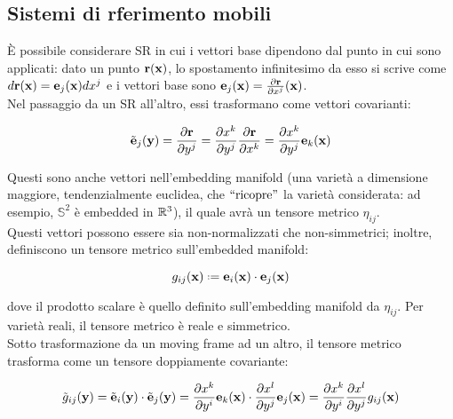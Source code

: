 \subsection{Sistemi di rferimento mobili}

È possibile considerare SR in cui i vettori base dipendono dal punto in cui sono applicati: dato un punto $ \mathbf{r}(\mathbf{x}) $, lo spostamento infinitesimo da esso si scrive come $ d\mathbf{r}(\mathbf{x}) = \mathbf{e}_j(\mathbf{x}) dx^j $ e i vettori base sono $ \mathbf{e}_j (\mathbf{x}) = \frac{\partial \mathbf{r}}{\partial x^j}(\mathbf{x}) $.\\
Nel passaggio da un SR all'altro, essi trasformano come vettori covarianti:

\begin{equation}
	\tilde{\mathbf{e}}_j (\mathbf{y}) = \frac{\partial \mathbf{r}}{\partial y^j} = \frac{\partial x^k}{\partial y^j} \frac{\partial \mathbf{r}}{\partial x^k} = \frac{\partial x^k}{\partial y^j} \mathbf{e}_k (\mathbf{x})
	\label{eq:1.14}
\end{equation}

Questi sono anche vettori nell'embedding manifold (una varietà a dimensione maggiore, tendenzialmente euclidea, che $ ``\text{ricopre}" $ la varietà considerata: ad esempio, $ \mathbb{S}^2 $ è embedded in $ \mathbb{R}^3 $), il quale avrà un tensore metrico $ \eta_{ij} $.\\
Questi vettori possono essere sia non-normalizzati che non-simmetrici; inoltre, definiscono un tensore metrico sull'embedded manifold:

\begin{equation}
	g_{ij} (\ve{x}) \defeq \ve{e}_i (\ve{x}) \cdot \ve{e}_j (\ve{x})
	\label{eq:1.15}
\end{equation}

dove il prodotto scalare è quello definito sull'embedding manifold da $ \eta_{ij} $. Per varietà reali, il tensore metrico è reale e simmetrico.\\
Sotto trasformazione da un moving frame ad un altro, il tensore metrico trasforma come un tensore doppiamente covariante:

\begin{equation}
	\tilde{g}_{ij} (\mathbf{y}) = \tilde{\mathbf{e}}_i (\mathbf{y}) \cdot \tilde{\mathbf{e}}_j (\mathbf{y}) = \frac{\partial x^k}{\partial y^i} \mathbf{e}_k (\mathbf{x}) \cdot \frac{\partial x^l}{\partial y^j} \mathbf{e}_j (\mathbf{x}) = \frac{\partial x^k}{\partial y^i} \frac{\partial x^l}{\partial y^j} g_{ij} (\mathbf{x})
	\label{eq:1.16}
\end{equation}










